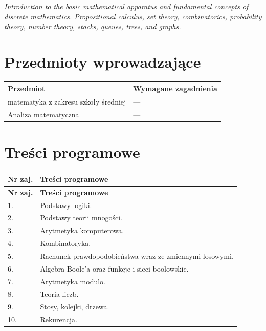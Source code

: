 \documentclass[12pt, a4paper]{article}
\newcommand{\thdrule}{\noalign{\global\setlength{\extrarowheight}{0pt}}}
\newcommand{\thdend}{\noalign{\global\setlength{\extrarowheight}{3pt}}}
\begin{document}
\textit{Introduction to the basic mathematical apparatus and fundamental concepts of discrete mathematics. Propositional calculus, set theory, combinatorics, probability theory, number theory, stacks, queues, trees, and graphs.}


\section{Przedmioty wprowadzające}

{\scriptsize
\begin{tabularx}{\textwidth}{m{5cm}Y}
\thdrule\toprule
{} {\color{white}\textbf{Przedmiot}} & {\color{white}\textbf{Wymagane zagadnienia}} \\
\midrule\thdend
   matematyka z zakresu szkoły średniej & --- \\
   Analiza matematyczna & --- \\
\bottomrule
\end{tabularx}}

\section{Treści programowe}

{\scriptsize
\begin{longtable}{m{1.5cm}m{14.5cm}}
\thdrule\toprule
\rowcolor{pjatkRed} {\color{white}\textbf{Nr zaj.}} & {\color{white}\textbf{Treści programowe}} \\
\midrule\thdend
\endfirsthead
\thdrule\toprule
\rowcolor{pjatkRed} {\color{white}\textbf{Nr zaj.}} & {\color{white}\textbf{Treści programowe}} \\
\midrule\thdend
\endhead
  \rowcolor{tableRowLight} 1. & Podstawy logiki. \\
  \rowcolor{tableRowAlt} 2. & Podstawy teorii mnogości. \\
  \rowcolor{tableRowLight} 3. & Arytmetyka komputerowa. \\
  \rowcolor{tableRowAlt} 4. & Kombinatoryka. \\
  \rowcolor{tableRowLight} 5. & Rachunek prawdopodobieństwa wraz ze zmiennymi losowymi. \\
  \rowcolor{tableRowAlt} 6. & Algebra Boole’a oraz funkcje i sieci boolowskie. \\
  \rowcolor{tableRowLight} 7. & Arytmetyka modulo. \\
  \rowcolor{tableRowAlt} 8. & Teoria liczb. \\
  \rowcolor{tableRowLight} 9. & Stosy, kolejki, drzewa. \\
  \rowcolor{tableRowAlt} 10. & Rekurencja. \\
\bottomrule
\end{longtable}}
\end{document}
